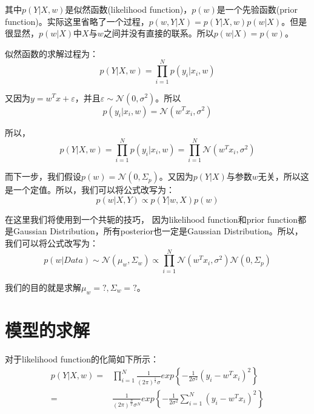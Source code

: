 \documentclass[a4paper]{article}
\begin{document}
其中$p(Y|X,w)$是似然函数(likelihood function)，$p(w)$是一个先验函数(prior function)。实际这里省略了一个过程，$p(w,Y|X)=p(Y|X,w)p(w|X)$。但是很显然，$p(w|X)$中$X$与$w$之间并没有直接的联系。所以$p(w|X)=p(w)$。

似然函数的求解过程为：
\begin{equation}
    p(Y|X,w) = \prod_{i=1}^N p(y_i|x_i,w) 
\end{equation}

又因为$y=w^Tx+\varepsilon$，并且$\varepsilon \sim \mathcal{N}(0,\sigma^2)$。所以
\begin{equation}
    p(y_i|x_i,w) = \mathcal{N}(w^Tx_i,\sigma^2)
\end{equation}

所以，
\begin{equation}
    p(Y|X,w) = \prod_{i=1}^N p(y_i|x_i,w) = \prod_{i=1}^N \mathcal{N}(w^Tx_i,\sigma^2)
\end{equation}

而下一步，我们假设$p(w)=\mathcal{N}(0,\Sigma_p)$。又因为$p(Y|X)$与参数$w$无关，所以这是一个定值。所以，我们可以将公式改写为：
\begin{equation}
    p(w|X,Y) \propto p(Y|w,X)p(w) 
\end{equation}

在这里我们将使用到一个共轭的技巧，{\color{red} 因为likelihood function和prior function都是Gaussian Distribution，所有posterior也一定是Gaussian Distribution。}所以，我们可以将公式改写为：
\begin{equation}
    p(w|Data) \sim \mathcal{N}(\mu_w,\Sigma_w) \propto \prod_{i=1}^N \mathcal{N}(w^Tx_i,\sigma^2) \mathcal{N}(0,\Sigma_p)
\end{equation}

我们的目的就是求解$\mu_w = ?,\Sigma_w = ?$。

\section{模型的求解}
对于likelihood function的化简如下所示：
\begin{align}
    p(Y|X,w) 
    = & \prod_{i=1}^N \frac{1}{(2\pi)^{\frac{1}{2}}\sigma} exp\left\{ -\frac{1}{2\sigma^2}(y_i - w^Tx_i)^2 \right\} \\
    = & \frac{1}{(2\pi)^{\frac{N}{2}}\sigma^N} exp\left\{ -\frac{1}{2\sigma^2}\sum_{i=1}^N(y_i - w^Tx_i)^2 \right\}
\end{align}
\end{document}
